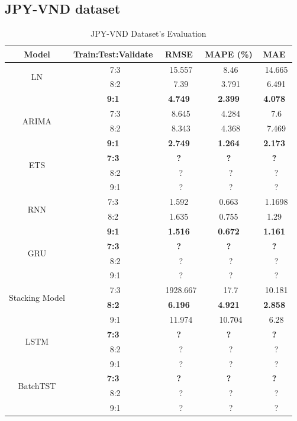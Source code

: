 \documentclass{ieeeojies}
\begin{document}
\subsection{JPY-VND dataset} 
\begin{table}[H]
    \centering
    \begin{tabular}{|c|c|c|c|c|}
         \hline
         \centering Model & Train:Test:Validate & RMSE & MAPE (\%) & MAE\\
         \hline
         \multirow{2}{*}{LN} &\ 7:3 &\ 15.557 &\ 8.46 &\ 14.665 \\ &\ 8:2 &\ 7.39 &\ 3.791 &\ 6.491 \\&\textbf{9:1} &\textbf{4.749} &\textbf{2.399} &\textbf{4.078} \\
         \hline
         \multirow{2}{*}{ARIMA} &\ 7:3 &\ 8.645 &\ 4.284 &\ 7.6 \\ &\ 8:2 &\ 8.343 &\ 4.368 &\ 7.469  \\ &\textbf{9:1} &\textbf{2.749} &\textbf{1.264} &\textbf{2.173} \\
         \hline
         \multirow{2}{*}{ETS} &\textbf{7:3} &\textbf{?}&\textbf{?}&\textbf{?} \\ &\ 8:2 &\ ?&\ ? &\ ? \\&\ 9:1 &\ ? &\ ? &\ ? \\
         \hline
         \multirow{2}{*}{RNN} &  7:3  & 1.592 & 0.663 &\ 1.1698 \\ & 8:2  & 1.635  & 0.755  & 1.29 \\&\textbf{9:1} &\textbf{1.516} &\textbf{0.672} &\textbf{1.161} \\
         \hline
         \multirow{2}{*}{GRU} &\textbf{7:3} &\textbf{?}&\textbf{?}&\textbf{?} \\ &\ 8:2 &\ ?&\ ? &\ ? \\&\ 9:1 &\ ? &\ ? &\ ? \\
         \hline
         \multirow{2}{*}{Stacking Model} &\ 7:3 &\ 1928.667 &\ 17.7 &\ 10.181 \\ &\textbf{8:2} &\textbf{6.196} &\textbf{4.921} &\textbf{2.858} \\&\ 9:1 &\ 11.974 &\ 10.704 &\ 6.28 \\
         \hline
         \multirow{2}{*}{LSTM} &\textbf{7:3} &\textbf{?}&\textbf{?}&\textbf{?} \\ &\ 8:2 &\ ?&\ ? &\ ? \\&\ 9:1 &\ ? &\ ? &\ ? \\
         \hline
         \multirow{2}{*}{BatchTST} &\textbf{7:3} &\textbf{?}&\textbf{?}&\textbf{?} \\ &\ 8:2 &\ ?&\ ? &\ ? \\&\ 9:1 &\ ? &\ ? &\ ? \\
         \hline
    \end{tabular}
    \caption{JPY-VND Dataset's Evaluation}
    \label{mbbresult}
\end{table}
\end{document}
